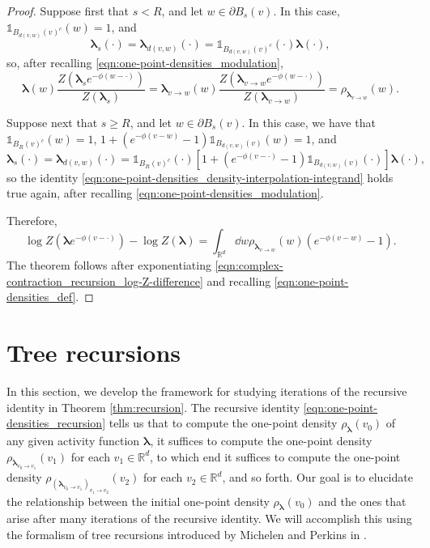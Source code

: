 \documentclass[11pt]{article}
\newcommand{\R}{\mathbb R}
\newcommand{\bl}{\bm{\lambda}}
\newcommand{\hcconst}{R}
\newcommand{\indicator}[1]{\mathds{1}_{#1}}
\numberwithin{equation}{section}
\theoremstyle{plain}
\theoremstyle{definition}
\theoremstyle{remark}
\begin{document}
\begin{proof}
Suppose first that $s<\hcconst$, and let $w\in\partial B_{s}(v)$.
In this case, $\indicator{B_{d(v,w)}(v)^{c}}(w)=1$, and 
\begin{equation}
\bl_{s}(\cdot)=\bl_{d(v,w)}(\cdot)=\indicator{B_{d(v,w)}(v)^{c}}(\cdot)\bl(\cdot),
\end{equation}
so, after recalling \eqref{eqn:one-point-densities_modulation},
\begin{equation}
\label{eqn:one-point-densities_density-interpolation-integrand}
\bl(w)\frac{Z(\bl_{s}e^{-\phi(w-\cdot)})}{Z(\bl_{s})}
=\bl_{v\rightarrow w}(w)\frac{Z(\bl_{v\rightarrow w}e^{-\phi(w-\cdot)})}{Z(\bl_{v\rightarrow w})}
=\rho_{\bl_{v\rightarrow w}}(w).
\end{equation}

Suppose next that $s\ge\hcconst$, and let $w\in\partial B_{s}(v)$.
In this case, we have that $\indicator{B_{\hcconst}(v)^{c}}(w)=1$, $1+(e^{-\phi(v-w)}-1)\indicator{B_{d(v,w)}(v)}(w)=1$, and 
\begin{equation}
\bl_{s}(\cdot)=\bl_{d(v,w)}(\cdot)=\indicator{B_{\hcconst}(v)^{c}}(\cdot)\left[1+(e^{-\phi(v-\cdot)}-1)\indicator{B_{d(v,w)}(v)}(\cdot)\right]\bl(\cdot),
\end{equation}
so the identity \eqref{eqn:one-point-densities_density-interpolation-integrand} holds true again, after recalling \eqref{eqn:one-point-densities_modulation}.

Therefore,
\begin{equation}
\label{eqn:complex-contraction_recursion_log-Z-difference}
\log Z(\bl e^{-\phi(v-\cdot)})-\log Z(\bl)
=\int_{\R^{d}}\dd{w}\rho_{\bl_{v\rightarrow w}}(w)(e^{-\phi(v-w)}-1).
\end{equation}
The theorem follows after exponentiating \eqref{eqn:complex-contraction_recursion_log-Z-difference} and recalling \eqref{eqn:one-point-densities_def}.
\end{proof}



\section{Tree recursions}
\label{sec:tree-recursions}

In this section, we develop the framework for studying iterations of the recursive identity in Theorem \ref{thm:recursion}.
The recursive identity \eqref{eqn:one-point-densities_recursion} tells us that to compute the one-point density $\rho_{\bl}(v_{0})$ of any given activity function $\bl$, it suffices to compute the one-point density $\rho_{\bl_{v_{0}\rightarrow v_{1}}}(v_{1})$ for each $v_{1}\in\R^{d}$, to which end it suffices to compute the one-point density $\rho_{(\bl_{v_{0}\rightarrow v_{1}})_{v_{1}\rightarrow v_{2}}}(v_{2})$ for each $v_{2}\in\R^{d}$, and so forth.
Our goal is to elucidate the relationship between the initial one-point density $\rho_{\bl}(v_{0})$ and the ones that arise after many iterations of the recursive identity.
We will accomplish this using the formalism of tree recursions introduced by Michelen and Perkins in \cite[\S4]{michelen2023analyticity}.
\end{document}
